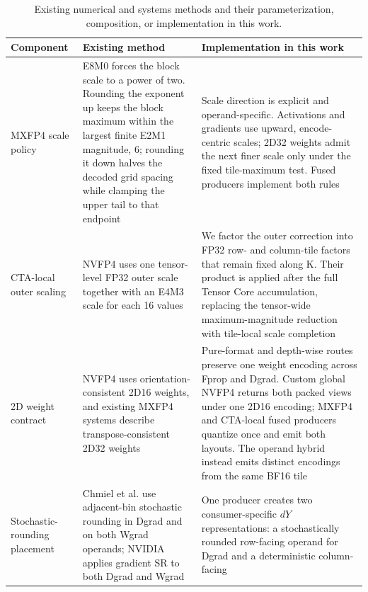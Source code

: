 \begin{table}[tbp]
  \centering
  \footnotesize
  \caption{Existing numerical and systems methods and their parameterization,
  composition, or implementation in this work.}
  \label{tab:prior-work-boundary}
  \begin{tabularx}{\textwidth}{@{}lYY@{}}
    \toprule
    Component & Existing method & Implementation in this work \\
    \midrule
    MXFP4 scale policy
      & E8M0 forces the block scale to a power of two. Rounding the exponent
        up keeps the block maximum within the largest finite E2M1 magnitude,
        6; rounding
        it down halves the decoded grid spacing while clamping the upper tail
        to that endpoint
        \cite{ocp2023mx,cim2026nativemxfp4}
      & Scale direction is explicit and operand-specific. Activations and
        gradients use upward, encode-centric scales; 2D32 weights admit the
        next finer scale only under the fixed tile-maximum test. Fused
        producers implement both rules \\
    CTA-local outer scaling
      & NVFP4 uses one tensor-level FP32 outer scale together with an E4M3
        scale for each 16 values \cite{ocp2023mx,nvidia2025nvfp4}
      & We factor the outer correction into FP32 row- and column-tile factors
        that remain fixed along K. Their product is applied after the full
        Tensor Core accumulation, replacing the tensor-wide maximum-magnitude
        reduction
        with tile-local scale completion \\
    2D weight contract
      & NVFP4 uses orientation-consistent 2D16 weights, and existing MXFP4
        systems describe transpose-consistent 2D32 weights
        \cite{nvidia2025nvfp4,nvidia2026te,rahimifar2026transposition,
        cim2026nativemxfp4}
      & Pure-format and depth-wise routes preserve one weight encoding across
        Fprop and Dgrad. Custom global NVFP4 returns both packed views under one 2D16
        encoding; MXFP4 and CTA-local fused producers quantize once and emit
        both layouts. The operand hybrid instead emits distinct encodings from
        the same BF16 tile \\
    Stochastic-rounding placement
      & Chmiel et al. use adjacent-bin stochastic rounding in Dgrad and on
        both Wgrad operands; NVIDIA applies gradient SR to both Dgrad and Wgrad
        \cite{chmiel2025fp4alltheway,nvidia2025nvfp4}
      & One producer creates two consumer-specific $dY$ representations: a
        stochastically rounded row-facing operand for Dgrad and a deterministic column-facing

\end{tabularx}
\end{table}
